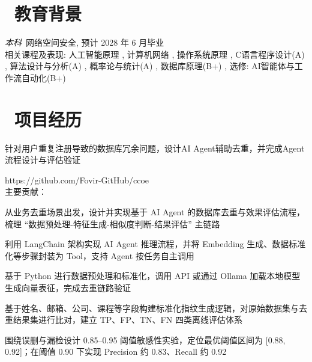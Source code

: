 \documentclass{resume}
\begin{document}
\section{\texorpdfstring{{\normalfont\faGraduationCap}\ }{}教育背景}
\textit{本科}\ 网络空间安全, 预计 2028 年 6 月毕业\\
相关课程及表现: 人工智能原理 , 计算机网络 , 操作系统原理 , C语言程序设计(A) , 算法设计与分析(A) , 概率论与统计(A) , 数据库原理(B+) , 选修: AI智能体与工作流自动化(B+)

\section{\texorpdfstring{{\normalfont\faUsers}\ }{}项目经历}
针对用户重复注册导致的数据库冗余问题，设计AI Agent辅助去重，并完成Agent流程设计与评估验证\\
\begin{onehalfspacing}
https://github.com/Fovir-GitHub/ccoe\\
主要贡献：
\begin{projectitems}
  \item 从业务去重场景出发，设计并实现基于 AI Agent 的数据库去重与效果评估流程，梳理 ``数据预处理-特征生成-相似度判断-结果评估'' 主链路
  \item 利用 LangChain 架构实现 AI Agent 推理流程，并将 Embedding 生成、数据标准化等步骤封装为 Tool，支持 Agent 按任务自主调用
  \item 基于 Python 进行数据预处理和标准化，调用 API 或通过 Ollama 加载本地模型生成向量表征，完成去重链路验证
  \item 基于姓名、邮箱、公司、课程等字段构建标准化指纹生成逻辑，对原始数据集与去重结果集进行比对，建立 TP、FP、TN、FN 四类离线评估体系
  \item 围绕误删与漏检设计 0.85--0.95 阈值敏感性实验，定位最优阈值区间为 [0.88, 0.92]；在阈值 0.90 下实现 Precision 约 0.83、Recall 约 0.92
\end{projectitems}
\end{onehalfspacing}
\projectdivider
\end{document}
